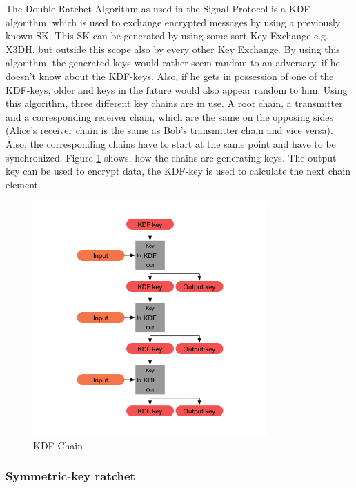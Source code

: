 \documentclass[12pt,oneside,a4paper,parskip]{scrbook}
\begin{document}
The Double Ratchet Algorithm as used in the Signal-Protocol is a KDF algorithm, which is used to exchange encrypted messages by using a previously known SK. This SK can be generated by using some sort Key Exchange e.g. X3DH, but outside this scope also by every other Key Exchange. By using this algorithm, the generated keys would rather seem random to an adversary, if he doesn't know about the KDF-keys. Also, if he gets in possession of one of the KDF-keys, older and keys in the future would also appear random to him. Using this algorithm, three different key chains are in use. A root chain, a transmitter and a corresponding receiver chain, which are the same on the opposing sides (Alice's receiver chain is the same as Bob's transmitter chain and vice versa). Also, the corresponding chains have to start at the same point and have to be synchronized. Figure \ref{fig:KDF_Chain} shows, how the chains are generating keys. The output key can be used to encrypt data, the KDF-key is used to calculate the next chain element.
\parencite{perrin_double_2016}

\begin{figure}[ht]
	\centering
  \includegraphics[width=0.8\textwidth]{ressources/kdf_chain.png}
  \caption{KDF Chain \parencite{perrin_double_2016}}
  \label{fig:KDF_Chain}
\end{figure}

\subsubsection{Symmetric-key ratchet}
\end{document}
